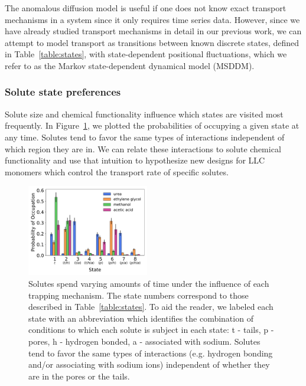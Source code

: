 \documentclass[journal=jctcce,manuscript=article]{achemso}
\begin{document}
  The anomalous diffusion model is useful if one does not know exact transport mechanisms 
  in a system since it only requires time series data. However, since we have
  already studied transport mechanisms in detail in our previous work, we can
  attempt to model transport as transitions between known discrete
  states, defined in Table~\ref{table:states}, with state-dependent positional
  fluctuations, which we refer to as the Markov state-dependent dynamical model (MSDDM).

  \subsubsection{Solute state preferences}\label{section:state_preferences}

  Solute size and chemical functionality influence which states are visited
  most frequently.  In Figure~\ref{fig:state_probabilities}, we plotted the
  probabilities of occupying a given state at any time. Solutes tend to favor
  the same types of interactions independent of which region they are in. We
  can relate these interactions to solute chemical functionality and use that
  intuition to hypothesize new designs for LLC monomers which control the
  transport rate of specific solutes.
  
  \begin{figure}
  \centering
  \includegraphics[width=0.475\textwidth]{state_probabilities.pdf}
  \caption{Solutes spend varying amounts of time under the influence of each
	  trapping mechanism. The state numbers correspond to those described in
	  Table~\ref{table:states}. To aid the reader, we labeled each state with an
	  abbreviation which identifies the combination of conditions to which
	  each solute is subject in each state: t - tails, p - pores, h -
	  hydrogen bonded, a - associated with sodium. Solutes tend to favor
	  the same types of interactions (e.g. hydrogen bonding and/or
	  associating with sodium ions) independent of whether they are in the
	  pores or the tails.}\label{fig:state_probabilities}
  \end{figure}
\end{document}
